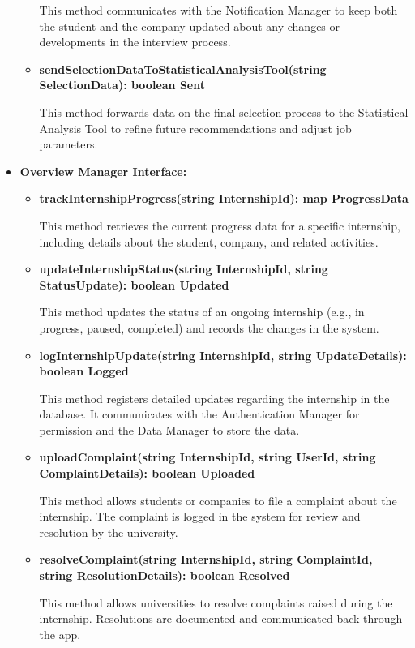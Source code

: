 \begin{itemize}
\begin{itemize}
    This method communicates with the Notification Manager to keep both the student and the company updated about any changes or developments in the interview process.

    \item \textbf{sendSelectionDataToStatisticalAnalysisTool(string SelectionData): boolean Sent}

    This method forwards data on the final selection process to the Statistical Analysis Tool to refine future recommendations and adjust job parameters.
    \end{itemize}



\item \textbf{Overview Manager Interface:}
\begin{itemize}
    \item \textbf{trackInternshipProgress(string InternshipId): map ProgressData}

    This method retrieves the current progress data for a specific internship, including details about the student, company, and related activities.

    \item \textbf{updateInternshipStatus(string InternshipId, string StatusUpdate): boolean Updated}

    This method updates the status of an ongoing internship (e.g., in progress, paused, completed) and records the changes in the system.

    \item \textbf{logInternshipUpdate(string InternshipId, string UpdateDetails): boolean Logged}

    This method registers detailed updates regarding the internship in the database. It communicates with the Authentication Manager for permission and the Data Manager to store the data.

    \item \textbf{uploadComplaint(string InternshipId, string UserId, string ComplaintDetails): boolean Uploaded}

    This method allows students or companies to file a complaint about the internship. The complaint is logged in the system for review and resolution by the university.

    \item \textbf{resolveComplaint(string InternshipId, string ComplaintId, string ResolutionDetails): boolean Resolved}

    This method allows universities to resolve complaints raised during the internship. Resolutions are documented and communicated back through the app.


\end{itemize}
\end{itemize}
